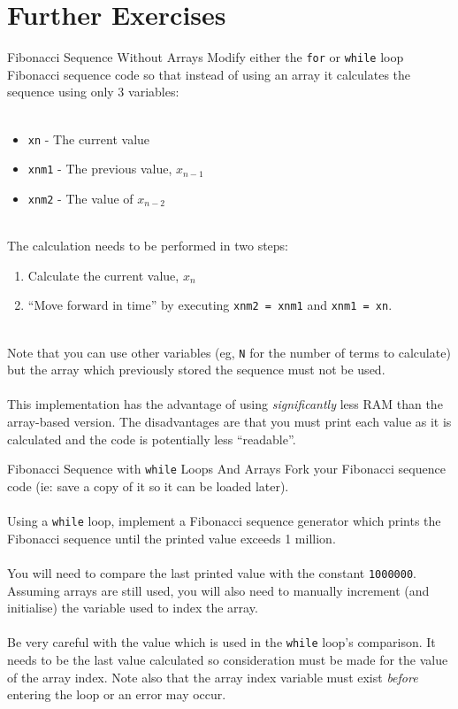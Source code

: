 \documentclass{lab}
\begin{document}
\pagebreak

\section{Further Exercises}

\begin{task}{Fibonacci Sequence Without Arrays}{}
Modify either the \texttt{for} or \texttt{while} loop Fibonacci sequence code so that instead of using an array it calculates the sequence using only 3 variables:
\\~
\begin{itemize}
\item \texttt{xn} - The current value
\item \texttt{xnm1} - The previous value, $x_{n-1}$
\item \texttt{xnm2} - The value of $x_{n-2}$
\end{itemize}
~\\
The calculation needs to be performed in two steps:
\\
\begin{enumerate}
\item Calculate the current value, $x_n$
\item ``Move forward in time'' by executing \texttt{xnm2 = xnm1} and \texttt{xnm1 = xn}.
\end{enumerate}
~\\
Note that you can use other variables (eg, \texttt{N} for the number of terms to calculate) but the array which previously stored the sequence must not be used.
\\~\\
This implementation has the advantage of using \textit{significantly} less RAM than the array-based version. The disadvantages are that you must print each value as it is calculated and the code is potentially less ``readable''.
\end{task}\label{task:noArray}

\begin{task}{Fibonacci Sequence with \texttt{while} Loops And Arrays}{}
Fork your Fibonacci sequence code (ie: save a copy of it so it can be loaded later).
\\~\\
Using a \texttt{while} loop, implement a Fibonacci sequence generator which prints the Fibonacci sequence until the printed value exceeds 1 million.
\\~\\
You will need to compare the last printed value with the constant \texttt{1000000}. Assuming arrays are still used, you will also need to manually increment (and initialise) the variable used to index the array.
\\~\\
Be very careful with the value which is used in the \texttt{while} loop's comparison. It needs to be the last value calculated so consideration must be made for the value of the array index. Note also that the array index variable must exist \textit{before} entering the loop or an error may occur.
\end{task}\label{task:fibWhileArray}
\end{document}

